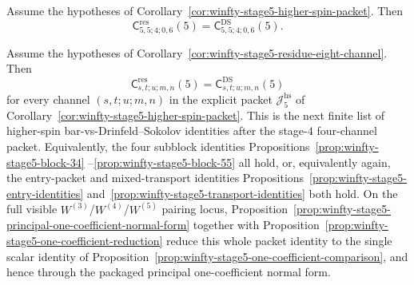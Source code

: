\begin{proposition}
\label{prop:winfty-stage5-block-55}
\ClaimStatusConditional{}
Assume the hypotheses of
Corollary~\ref{cor:winfty-stage5-higher-spin-packet}. Then
\[
\mathsf{C}^{\mathrm{res}}_{5,5;4;0,6}(5)
=
\mathsf{C}^{\mathrm{DS}}_{5,5;4;0,6}(5).
\]
\end{proposition}

\begin{proposition}
\label{prop:winfty-stage5-higher-spin-identities}
\ClaimStatusConditional{}
Assume the hypotheses of
Corollary~\ref{cor:winfty-stage5-residue-eight-channel}. Then
\[
\mathsf{C}^{\mathrm{res}}_{s,t;u;m,n}(5)
=
\mathsf{C}^{\mathrm{DS}}_{s,t;u;m,n}(5)
\]
for every channel $(s,t;u;m,n)$ in the explicit packet
$\mathcal{J}_5^{\mathrm{hs}}$ of
Corollary~\ref{cor:winfty-stage5-higher-spin-packet}. This is the
next finite list of higher-spin bar-vs-Drinfeld--Sokolov identities
after the stage-$4$ four-channel packet. Equivalently, the four
subblock identities
Propositions~\ref{prop:winfty-stage5-block-34}
--\ref{prop:winfty-stage5-block-55}
all hold, or, equivalently again, the entry-packet and mixed-transport
identities
Propositions~\ref{prop:winfty-stage5-entry-identities}
and~\ref{prop:winfty-stage5-transport-identities}
both hold. On the full visible
\texorpdfstring{$W^{(3)}$}{W3}/\texorpdfstring{$W^{(4)}$}{W4}/\texorpdfstring{$W^{(5)}$}{W5}
pairing locus,
Proposition~\ref{prop:winfty-stage5-principal-one-coefficient-normal-form}
together with Proposition~\ref{prop:winfty-stage5-one-coefficient-reduction}
reduce this whole packet identity to the single scalar identity of
Proposition~\ref{prop:winfty-stage5-one-coefficient-comparison},
and hence through the packaged principal one-coefficient normal form.
\end{proposition}

